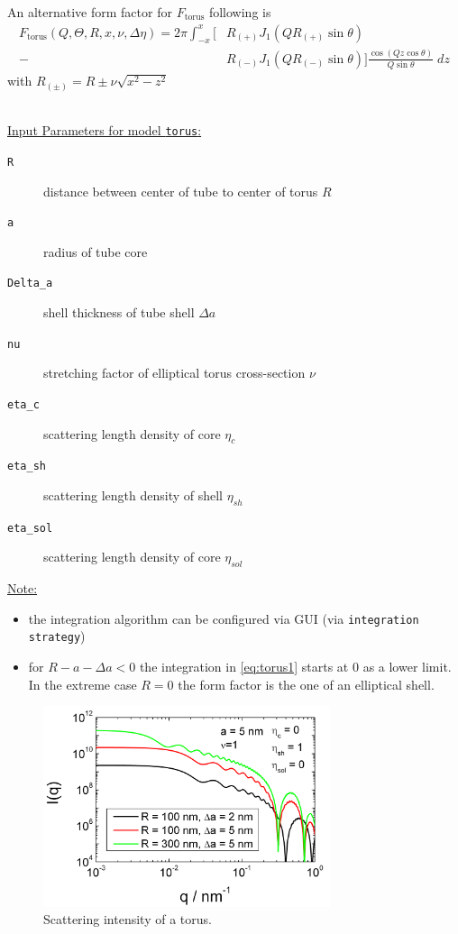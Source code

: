 An alternative form factor for $F_\text{torus}$ following \cite{Forster1999} is
\begin{align}
F_\text{torus}(Q,\Theta,R,x,\nu,\Delta\eta)  = 2\pi\int_{-x}^{x}
\bigg[
 & R_{(+)} J_1(QR_{(+)}\sin\theta) \\
-& R_{(-)} J_1(QR_{(-)}\sin\theta) \bigg]
\frac{\cos(Qz\cos\theta)}{Q\sin\theta} \; dz \nonumber
\end{align}
with $R_{(\pm)} = R\pm\nu\sqrt{x^2-z^2}$

\hspace{1pt}\\
\uline{Input Parameters for model \texttt{torus}:}\\
\begin{description}
\item[\texttt{R}] distance between center of tube to center of torus $R$
\item[\texttt{a}] radius of tube core
\item[\texttt{Delta\_a}] shell thickness of tube shell $\Delta a$
\item[\texttt{nu}] stretching factor of elliptical torus cross-section $\nu$
\item[\texttt{eta\_c}] scattering length density of core $\eta_c$
\item[\texttt{eta\_sh}] scattering length density of shell $\eta_{sh}$
\item[\texttt{eta\_sol}] scattering length density of core $\eta_{sol}$
\end{description}

\noindent\uline{Note:}
\begin{itemize}
\item the integration algorithm can be configured via GUI (via \texttt{integration strategy})
\item for $R-a-\Delta a <0$ the integration in \ref{eq:torus1} starts at 0 as a lower limit. In the extreme case $R=0$ the form factor is the one of an elliptical shell.
\end{itemize}

\begin{figure}[htb]
\begin{center}
\includegraphics[width=0.75\textwidth]{../images/form_factor/cylindrical_obj/Torus.png}
\end{center}
\caption{Scattering intensity of a torus.}
\label{fig:Torus}
\end{figure}


